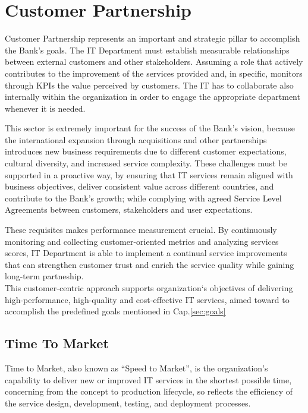 \chapter{Customer Partnership}

Customer Partnership represents an important and strategic pillar to accomplish the Bank's goals. The IT Department must establish measurable relationships between external customers and other stakeholders. Assuming a role that actively contributes to the improvement of the services provided and, in specific, monitors through KPIs the value perceived by customers.
The IT has to collaborate also internally within the organization in order to engage the appropriate department whenever it is needed.

This sector is extremely important for the success of the Bank's vision, because the international expansion through acquisitions and other partnerships introduces new business requirements due to different customer expectations, cultural diversity, and increased service complexity.
These challenges must be supported in a proactive way, by ensuring that IT services remain aligned with business objectives, deliver consistent value across different countries, and contribute to the Bank's growth; while complying with agreed Service Level Agreements between customers, stakeholders and user expectations.


These requisites makes performance measurement crucial. By continuously monitoring and collecting customer-oriented metrics and analyzing services scores, IT Department is able to implement a continual service improvements that can strengthen customer trust and enrich the service quality while gaining long-term partneship. \\
This customer-centric approach supports organization`s objectives of delivering high-performance, high-quality and cost-effective IT services, aimed toward to accomplish the predefined goals mentioned in Cap.\ref{sec:goals}


\section{Time To Market}
\label{subs:timetomarket}

Time to Market, also known as ``Speed to Market'', is the organization's capability to deliver new or improved IT services in the shortest possible time, concerning from the concept to production lifecycle, so reflects the efficiency of the service design, development, testing, and deployment processes.

